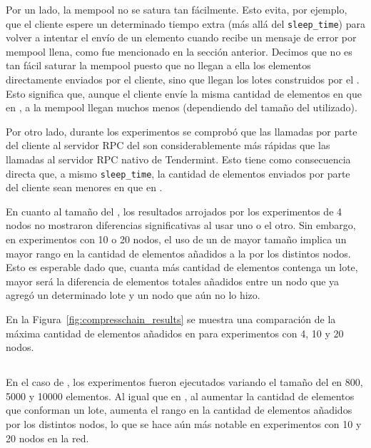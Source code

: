 Por un lado, la mempool no se satura tan fácilmente. Esto evita, por ejemplo, que el cliente espere un determinado tiempo
extra (más allá del \texttt{sleep\_time}) para volver a intentar el envío de un elemento cuando recibe un mensaje de error por mempool llena,
como fue mencionado en la sección anterior.
Decimos que no es tan fácil saturar la mempool puesto que no llegan a ella los elementos directamente enviados por el cliente,
sino que llegan los lotes construidos por el \collector.
Esto significa que, aunque el cliente envíe la misma cantidad de elementos en \vanilla que en \compresschain, a la mempool llegan
muchos menos (dependiendo del tamaño del \collector utilizado).

Por otro lado, durante los experimentos se comprobó que las llamadas por parte del cliente al servidor RPC del \collector
son considerablemente más rápidas que las llamadas al servidor RPC nativo de Tendermint.
Esto tiene como consecuencia directa que, a mismo \texttt{sleep\_time}, la cantidad de elementos enviados por parte del cliente
sean menores en \vanilla que en \compresschain.


En cuanto al tamaño del \collector, los resultados arrojados por los experimentos de 4 nodos no mostraron diferencias significativas
al usar uno o el otro.
Sin embargo, en experimentos con 10 o 20 nodos, el uso de un \collector de mayor tamaño implica un mayor rango en la cantidad
de elementos añadidos a la \setchain por los distintos nodos.
Esto es esperable dado que, cuanta más cantidad de elementos contenga un lote, mayor será la diferencia de elementos totales añadidos
entre un nodo que ya agregó un determinado lote y un nodo que aún no lo hizo.

En la Figura~\ref{fig:compresschain_results} se muestra una comparación de la máxima cantidad de elementos añadidos en \compresschain para experimentos con
4, 10 y 20 nodos.


\subsection{\hashchain}

En el caso de \hashchain, los experimentos fueron ejecutados variando el tamaño del \collector en 800, 5000 y 10000 elementos.
Al igual que en \compresschain, al aumentar la cantidad de elementos que conforman un lote, aumenta el rango en la cantidad
de elementos añadidos por los distintos nodos, lo que se hace aún más notable en experimentos con 10 y 20 nodos en la red.

